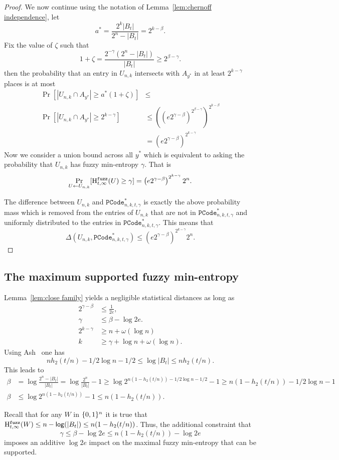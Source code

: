 \begin{proof}
\noindent
We now continue using the notation of Lemma~\ref{lem:chernoff independence}, let 
\[
a^* =\frac{2^k|B_t|}{2^n - |B_t|}=2^{k-\beta}.
\]
Fix the value of $\zeta$ such that 
\[1+\zeta = \frac{2^{-\gamma}(2^n - |B_t|)}{|B_t|} \ge 2^{\beta-\gamma}. \]
then the probability that an entry in $U_{n,k}$ intersects with $A_{y^*}$ in at least $2^{k-\gamma}$ places is at most 
\begin{align*}
\Pr[|U_{n,k} \cap A_{y^*}| \ge a^*(1+\zeta)] &\le \\
\Pr[| U_{n,k} \cap A_{y^*} | \ge 2^{k-\gamma}] &\le \left(\left(e2^{\gamma-\beta}\right)^{2^{\beta-\gamma}}\right)^{2^{k-\beta}} \\&= \left(e2^{\gamma-\beta}\right)^{2^{k-\gamma}}
\end{align*}
Now we consider a union bound across all $y^*$ which is equivalent to asking the probability that $U_{n,k}$ has fuzzy min-entropy $\gamma$.  That is
\[
\Pr_{U\leftarrow U_{n,k}}[\mathrm{H}^{\mathtt{fuzz}}_{t,\infty}(U)\ge \gamma] = \left(e2^{\gamma-\beta}\right)^{2^{k-\gamma}}2^n.
\]

The difference between $U_{n,k}$ and $\mathtt{PCode}_{n, k, t, \gamma}^{*}$ is exactly the above probability mass which is removed from the entries of $U_{n,k}$ that are not in $\mathtt{PCode}_{n, k, t, \gamma}^{*}$ and uniformly distributed to the entries in $\mathtt{PCode}_{n, k, t, \gamma}^{*}$.  This means that 
\[
\Delta(U_{n,k}, \mathtt{PCode}_{n, k, t, \gamma}^{*}) \le \left(e2^{\gamma-\beta}\right)^{2^{k-\gamma}}2^n.
\]
\end{proof}

\subsection{The maximum supported fuzzy min-entropy}
\label{ssec:how much fuzzy}
 Lemma~\ref{lem:close family} yields a negligible statistical distances as long as 
\begin{align*}
2^{\gamma - \beta} &\le \frac{1}{2e},\\
 \gamma &\le \beta -\log{2e}.\\
2^{k-\gamma}&\ge n+\omega(\log n)\\
k &\ge \gamma + \log{n+ \omega(\log{n})}.
\end{align*}
Using Ash~\cite[Lemma 4.7.2, Equation 4.7.5, p. 115]{ash2012information} one has
\[ nh_2(t/n)  -1/2\log{n} - 1/2 \le \log{|B_t|} \le  nh_2(t/n).\]
This leads to 
\begin{align*}
\beta &= \log{\frac{2^n - |B_t|}{|B_t|}} = \log{\frac{2^n}{|B_t|} -1} \ge \log{2^{n(1-h_2(t/n)) - 1/2 \log{n}-1/2} -1} \ge n(1-h_2(t/n)) - 1/2\log{n}-1\\
\beta&\le \log{2^{n(1-h_2(t/n))} -1} \le n(1-h_2(t/n)).
\end{align*}

Recall that for any $W$ in $\{0, 1\}^n$ it is true that $\mathrm{H}^{\mathtt{fuzz}}_{t,\infty}(W) \le n -\mathsf{log}\!\left(|B_t|\right) \le n(1-h_2(t/n))$.  Thus, the additional constraint that 
\[
\gamma \le \beta - \log{2e}
\le n(1-h_2(t/n)) - \log{2e}\] imposes an additive $\log{2e}$ impact on the maximal fuzzy min-entropy that can be supported. 
